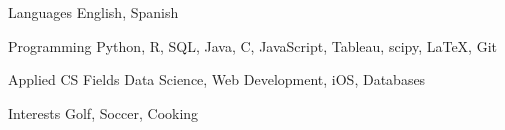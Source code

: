 

\begin{cvskills}

\cvskill
  {Languages} %
  {English, Spanish} %

  \cvskill
    {Programming} %
    {Python, R, SQL, Java, C, JavaScript, Tableau, scipy, LaTeX, Git} %

  \cvskill
    {Applied CS Fields} %
    {Data Science, Web Development, iOS, Databases} %

  \cvskill
  {Interests}
  {Golf, Soccer, Cooking}

\end{cvskills}
